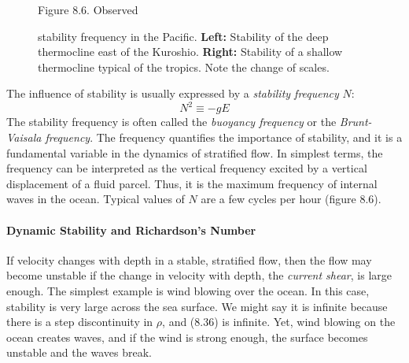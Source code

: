 \begin{figure}[t!]
\footnotesize
Figure 8.6. Observed \rule{0pt}{3ex} stability frequency
in the Pacific.
\textbf{Left:} Stability of the deep thermocline east of the
Kuroshio.
\textbf{Right:} Stability of a shallow thermocline typical of the tropics. Note
the change of scales.
\label{fig:stabilityfreq}
\vspace{-3ex}
\end{figure}

The influence of stability is usually expressed by a
\textit{stability frequency}
$N$:
\begin{equation}
N^2 \equiv -g E
\end{equation}
The stability frequency is often called the \textit{buoyancy
frequency} or the \textit{Brunt-Vaisala
frequency}. The frequency quantifies the importance of
stability, and it is a fundamental variable in the dynamics of stratified flow. In simplest
terms, the frequency can be interpreted as the vertical frequency excited by a vertical
displacement of a fluid parcel. Thus, it is the maximum frequency of internal waves in the
ocean. Typical values of $N$ are a few cycles per hour (figure 8.6).

\paragraph{Dynamic Stability and Richardson's Number}
If velocity changes with depth in a stable, stratified flow, then the flow may
become unstable if the change in velocity with depth, the \textit{current
shear}, is large enough. The simplest example is wind
blowing over the ocean. In this case, stability is very large across the sea
surface. We might say it is infinite because there is a step discontinuity in
$\rho$, and (8.36) is infinite. Yet, wind blowing on the ocean creates waves, and
if the wind is strong enough, the surface becomes unstable and the waves break.

